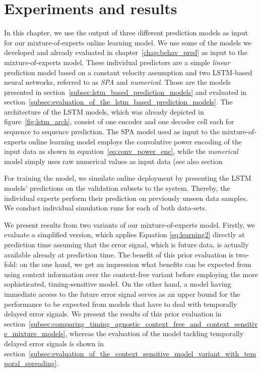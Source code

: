 \section{Experiments and results}%
\label{sec:experiments_and_results}

In this chapter, we use the output of three different prediction models as input for our mixture-of-experts online learning model.
We use some of the models we developed and already evaluated in chapter~\ref{chap:behav_pred} as input to the mixture-of-experts model.
These individual predictors are a simple \emph{linear} prediction model based on a constant velocity assumption and two \ac{LSTM}-based neural networks, referred to as \emph{\acs{SPA}} and \emph{numerical}.
Those are the models presented in section~\ref{subsec:lstm_based_prediction_models} and evaluated in section~\ref{subsec:evaluation_of_the_lstm_based_prediction_models}.
The architecture of the \ac{LSTM} models, which was already depicted in figure~\ref{fig:lstm_arch}, consist of one encoder and one decoder cell each for sequence to sequence prediction.
The \ac{SPA} model used as input to the mixture-of-experts online learning model employs the convolutive power encoding of the input data as shown in equation~\eqref{eq:conv_power_enc}, while the \emph{numerical} model simply uses raw numerical values as input data (see also section

For training the model, we simulate online deployment by presenting the \ac{LSTM} models' predictions on the validation subsets to the system.
Thereby, the individual experts perform their prediction on previously unseen data samples.
We conduct individual simulation runs for each of both data-sets.

We present results from two variants of our mixture-of-experts model.
Firstly, we evaluate a simplified version, which applies Equation \eqref{eq:learning2} directly at prediction time assuming that the error signal, which is future data, is actually available already at prediction time. 
The benefit of this prior evaluation is two-fold: on the one hand, we get an impression what benefits can be expected from using context information over the context-free variant before employing the more sophisticated, timing-sensitive model.
On the other hand, a model having immediate access to the future error signal serves as an upper bound for the performance to be expected from models that have to deal with temporally delayed error signals. 
We present the results of this prior evaluation in section~\ref{subsec:comparing_timing_agnostic_context_free_and_context_sensitive_mixture_models}, whereas the evaluation of the model tackling temporally delayed error signals is shown in section~\ref{subsec:evaluation_of_the_context_sensitive_model_variant_with_temporal_spreading}.

